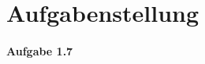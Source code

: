 \documentclass[10pt]{article}
\begin{document}
\section{Aufgabenstellung}
\paragraph{Aufgabe 1.7}
\end{document}
